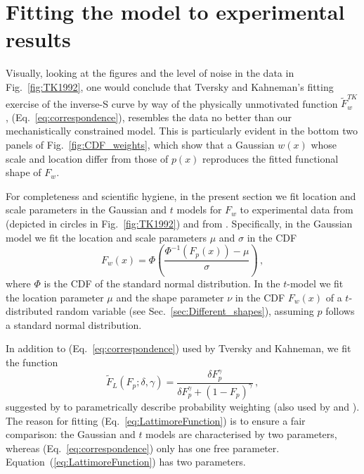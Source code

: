 \documentclass[a4paper, 12pt]{article}
\newcommand{\elabel}[1]{\label{eq:#1}}
\newcommand{\eref}[1]{(Eq.~\ref{eq:#1})}
\newcommand{\Eref}[1]{Equation~(\ref{eq:#1})}
\newcommand{\fref}[1]{Fig.~\ref{fig:#1}}
\newcommand{\seclabel}[1]{\label{sec:#1}}
\newcommand{\secref}[1]{Sec.~\ref{sec:#1}}
\newcommand{\be}{\begin{equation}}
\newcommand{\ee}{\end{equation}}
\begin{document}
\section{Fitting the model to experimental results \seclabel{Fitting_the}}

Visually, looking at the figures and the level of noise in the data in \fref{TK1992}, one would conclude that Tversky and Kahneman's fitting exercise of the inverse-S curve by way of the physically unmotivated function $\tilde{F}^{TK}_w$, \eref{correspondence}, resembles the data no better than our mechanistically constrained model. This is particularly evident in the bottom two panels of \fref{CDF_weights}, which show that a Gaussian $w(x)$ whose scale and location differ from those of $p(x)$ reproduces the fitted functional shape of $F_w$.

For completeness and scientific hygiene, in the present section we fit location and scale parameters in the Gaussian and $t$ models for $F_w$ to experimental data from \cite{TverskyKahneman1992} (depicted in circles in \fref{TK1992}) and from \cite{TverskyFox1995}. Specifically, in the Gaussian model we fit the location and scale parameters $\mu$ and $\sigma$ in the CDF
%
\be
F_w\left(x\right) = \Phi\left(\frac{\Phi^{-1}\left(F_p\left(x\right)\right) - \mu}{\sigma}\right)\,,
\ee
%
where $\Phi$ is the CDF of the standard normal distribution. In the $t$-model we fit the location parameter $\mu$ and the shape parameter $\nu$ in the CDF $F_w\left(x\right)$ of a $t$-distributed random variable (see \secref{Different_shapes}), assuming $p$ follows a standard normal distribution.


In addition to \eref{correspondence} used by Tversky and Kahneman, we fit the function
%
\be
\tilde{F}_{L}\left(F_p; \delta,\gamma\right) =\frac{\delta F_p^{\gamma}}{\delta F_p^{\gamma} + \left(1-F_p\right)^{\gamma}}\,,
\elabel{LattimoreFunction}
\ee
%
suggested by \cite{LattimoreBakerWitte1992} to parametrically describe probability weighting (also used by \cite{tversky1995risk} and \cite{Prelec1998}). The reason for fitting \eref{LattimoreFunction} is to ensure a fair comparison: the Gaussian and $t$ models are characterised by two parameters, whereas \eref{correspondence} only has one free parameter. \Eref{LattimoreFunction} has two parameters.
\end{document}
